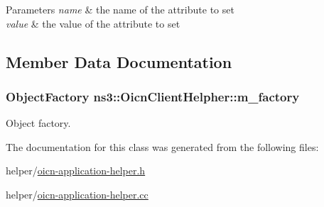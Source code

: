 \begin{DoxyParams}{Parameters}
{\em name} & the name of the attribute to set \\
\hline
{\em value} & the value of the attribute to set \\
\hline
\end{DoxyParams}


\subsection{Member Data Documentation}
\hypertarget{classns3_1_1OicnClientHelpher_aa58d9af446cdcba7fbaf4a0f579962fe}{
\subsubsection[{m\-\_\-factory}]{\setlength{\rightskip}{0pt plus 5cm}Object\-Factory ns3\-::\-Oicn\-Client\-Helpher\-::m\-\_\-factory\hspace{0.3cm}{\ttfamily [private]}}}\label{classns3_1_1OicnClientHelpher_aa58d9af446cdcba7fbaf4a0f579962fe}


Object factory. 



The documentation for this class was generated from the following files\-:\begin{DoxyCompactItemize}
\item 
helper/\hyperlink{oicn-application-helper_8h}{oicn-\/application-\/helper.\-h}\item 
helper/\hyperlink{oicn-application-helper_8cc}{oicn-\/application-\/helper.\-cc}\end{DoxyCompactItemize}
